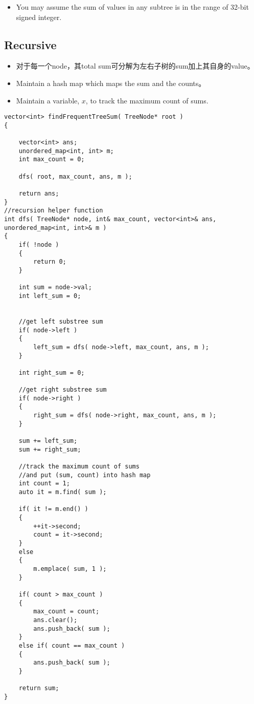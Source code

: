 \begin{itemize}
\item You may assume the sum of values in any subtree is in the range of 32-bit signed integer.
\end{itemize}

\subsection{Recursive}
\begin{itemize}
\item 对于每一个node，其total sum可分解为左右子树的sum加上其自身的value。
\item Maintain a hash map which maps the sum and the counts。
\item Maintain a variable, $x$, to track the maximum count of sums.
\end{itemize}

\setcounter{lstlisting}{0}
\begin{lstlisting}[style=customc, caption={Recursion}]
vector<int> findFrequentTreeSum( TreeNode* root )
{

    vector<int> ans;
    unordered_map<int, int> m;
    int max_count = 0;

    dfs( root, max_count, ans, m );

    return ans;
}
//recursion helper function
int dfs( TreeNode* node, int& max_count, vector<int>& ans, unordered_map<int, int>& m )
{
    if( !node )
    {
        return 0;
    }

    int sum = node->val;
    int left_sum = 0;


    //get left substree sum
    if( node->left )
    {
        left_sum = dfs( node->left, max_count, ans, m );
    }

    int right_sum = 0;

    //get right substree sum
    if( node->right )
    {
        right_sum = dfs( node->right, max_count, ans, m );
    }

    sum += left_sum;
    sum += right_sum;

    //track the maximum count of sums
    //and put (sum, count) into hash map
    int count = 1;
    auto it = m.find( sum );

    if( it != m.end() )
    {
        ++it->second;
        count = it->second;
    }
    else
    {
        m.emplace( sum, 1 );
    }

    if( count > max_count )
    {
        max_count = count;
        ans.clear();
        ans.push_back( sum );
    }
    else if( count == max_count )
    {
        ans.push_back( sum );
    }

    return sum;
}
\end{lstlisting}
